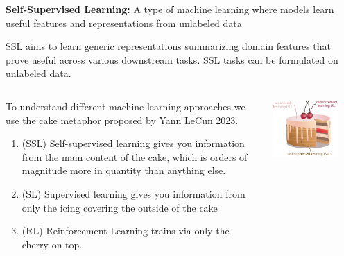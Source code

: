 \documentclass[10pt]{beamer}
\begin{document}
\begin{frame}
\textbf{Self-Supervised Learning:} A type of machine learning where models learn useful features and
  representations from unlabeled data

SSL aims to learn generic representations summarizing domain features that prove
useful across various downstream tasks. SSL tasks can be formulated on
unlabeled data.
\vspace{0.3cm}
\begin{columns}
  \begin{column}{0.6\textwidth}
    \begin{small}
    To understand different machine learning approaches we use the cake metaphor proposed by Yann LeCun 2023.

    \begin{enumerate}
      \item (SSL) Self-supervised learning gives you information from the main content of the cake, which is orders of magnitude more in quantity than anything else.
      \item (SL) Supervised learning gives you information from only the icing covering the outside of the cake
      \item (RL) Reinforcement Learning trains via only the cherry on top.
    \end{enumerate}
  \end{small}
  \end{column}
  \begin{column}{0.4\textwidth}
    \includegraphics[width=0.8\textwidth]{images/cake.png}
  \end{column}
\end{columns}




\end{frame}
\end{document}
